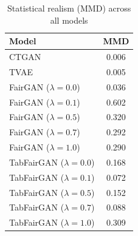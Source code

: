 \begin{table}[h!]
\label{tab:results-realism-mmd}
\centering
\begin{tabular}{lc}
\toprule
Model & MMD \\
\midrule
CTGAN & 0.006 \\
TVAE & 0.005 \\
FairGAN ($\lambda=0.0$) & 0.036 \\
FairGAN ($\lambda=0.1$) & 0.602 \\
FairGAN ($\lambda=0.5$) & 0.320 \\
FairGAN ($\lambda=0.7$) & 0.292 \\
FairGAN ($\lambda=1.0$) & 0.290 \\
TabFairGAN ($\lambda=0.0$) & 0.168 \\
TabFairGAN ($\lambda=0.1$) & 0.072 \\
TabFairGAN ($\lambda=0.5$) & 0.152 \\
TabFairGAN ($\lambda=0.7$) & 0.088 \\
TabFairGAN ($\lambda=1.0$) & 0.309 \\
\bottomrule
\end{tabular}
\caption{Statistical realism (MMD) across all models}
\end{table}
